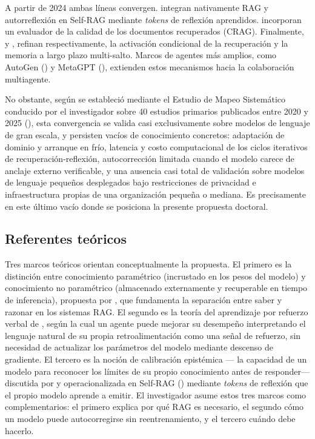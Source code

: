 A partir de 2024 ambas líneas convergen. \textcite{Asai2024_Selfrag} integran nativamente RAG y autorreflexión en Self-RAG mediante \textit{tokens} de reflexión aprendidos. \textcite{Yan2024_CRAG} incorporan un evaluador de la calidad de los documentos recuperados (CRAG). Finalmente, \textcite{Su2024_DRAGIN} y \textcite{JimGutierrez2024_HippoRAG}, refinan respectivamente, la activación condicional de la recuperación y la memoria a largo plazo multi-salto. Marcos de agentes más amplios, como AutoGen (\cite{Wu2024_AutoGen}) y MetaGPT (\cite{Hong2023_MetaGPT}), extienden estos mecanismos hacia la colaboración multiagente. 

No obstante, según se estableció mediante el Estudio de Mapeo Sistemático conducido por el investigador sobre 40 estudios primarios publicados entre 2020 y 2025 (\cite{Alcides2026}), esta convergencia se valida casi exclusivamente sobre modelos de lenguaje de gran escala, y persisten vacíos de conocimiento concretos: adaptación de dominio y arranque en frío, latencia y costo computacional de los ciclos iterativos de recuperación-reflexión, autocorrección limitada cuando el modelo carece de anclaje externo verificable, y una ausencia casi total de validación sobre modelos de lenguaje pequeños desplegados bajo restricciones de privacidad e infraestructura propias de una organización pequeña o mediana. Es precisamente en este último vacío donde se posiciona la presente propuesta doctoral.

\subsection{Referentes teóricos}

Tres marcos teóricos orientan conceptualmente la propuesta. El primero es la distinción entre conocimiento paramétrico (incrustado en los pesos del modelo) y conocimiento no paramétrico (almacenado externamente y recuperable en tiempo de inferencia), propuesta por \textcite{Lewis2020rag}, que fundamenta la separación entre \textquotedbl{}saber\textquotedbl{} y \textquotedbl{}razonar\textquotedbl{} en los sistemas RAG. El segundo es la teoría del aprendizaje por refuerzo verbal de \textcite{Shinn2023_Reflexion}, según la cual un agente puede mejorar su desempeño interpretando el lenguaje natural de su propia retroalimentación como una señal de refuerzo, sin necesidad de actualizar los parámetros del modelo mediante descenso de gradiente. El tercero es la noción de calibración epistémica --- la capacidad de un modelo para reconocer los límites de su propio conocimiento antes de responder--- discutida por \textcite{Jiang2024_KnowsWhat} y operacionalizada en Self-RAG (\cite{Asai2024_Selfrag}) mediante \textit{tokens} de reflexión que el propio modelo aprende a emitir. El investigador asume estos tres marcos como complementarios: el primero explica por qué RAG es necesario, el segundo cómo un modelo puede autocorregirse sin reentrenamiento, y el tercero cuándo debe hacerlo.

